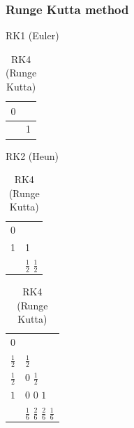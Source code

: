 \documentclass[student, noshadow, lsr, english, aspectratio=169]{ITR_LSR_slides}
\begin{document}
\begin{frame}
	\frametitle{Runge Kutta method}
	\begin{table}[htbp]
		\caption{Butcher tableau \cite{grune2017nonlinear}}
	\end{table}
	\begin{table}[htbp]
		\begin{minipage}{.33\linewidth}
			\centering
			\caption{\label{tab:RK1}RK1 (Euler)}
			\begin{tabular}{c|l}
				    $0$ &  \\
				    \hline
				    & 1    
			\end{tabular}
		\end{minipage}%
		\begin{minipage}{.33\linewidth}
			\centering
			\caption{\label{tab:RK2}RK2 (Heun)}
			\begin{tabular}{c|l}
				$0$ &  \\
				1 & 1  \\
				\hline
				& $\frac{1}{2}$ $\frac{1}{2}$
			\end{tabular}
		\end{minipage} %
		\begin{minipage}{.33\linewidth}
			\caption{\label{tab:RK4}RK4 (Runge Kutta)}
			\centering
			\begin{tabular}{c|l}
				$0$ &  \\
				$\frac{1}{2}$ & $\frac{1}{2}$ \\
				$\frac{1}{2}$ & $0$ $\frac{1}{2}$\\
				$1$ & $0$ $0$ $1$            \\
				\hline
				& $\frac{1}{6}$ $\frac{2}{6}$ $\frac{2}{6}$ $\frac{1}{6}$
			\end{tabular}
		\end{minipage}
	\end{table}
\end{frame}
\end{document}
